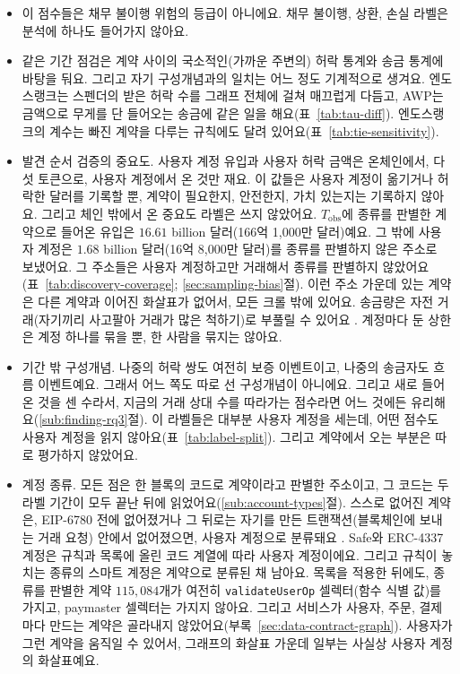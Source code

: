 \begin{itemize}
\item 이 점수들은 채무 불이행 위험의 등급이 아니에요. 채무 불이행, 상환, 손실 라벨은 분석에 하나도 들어가지 않아요.
\item 같은 기간 점검은 계약 사이의 국소적인(가까운 주변의) 허락 통계와 송금 통계에 바탕을 둬요. 그리고 자기 구성개념과의 일치는 어느 정도 기계적으로 생겨요. 엔도스랭크는 스펜더의 받은 허락 수를 그래프 전체에 걸쳐 매끄럽게 다듬고, AWP는 금액으로 무게를 단 들어오는 송금에 같은 일을 해요(표~\ref{tab:tau-diff}). 엔도스랭크의 계수는 빠진 계약을 다루는 규칙에도 달려 있어요(표~\ref{tab:tie-sensitivity}).
\item 발견 순서 검증의 중요도. 사용자 계정 유입과 사용자 허락 금액은 온체인에서, 다섯 토큰으로, 사용자 계정에서 온 것만 재요. 이 값들은 사용자 계정이 옮기거나 허락한 달러를 기록할 뿐, 계약이 필요한지, 안전한지, 가치 있는지는 기록하지 않아요. 그리고 체인 밖에서 온 중요도 라벨은 쓰지 않았어요. $T_{\mathrm{obs}}$에 종류를 판별한 계약으로 들어온 유입은 $16.61$ billion 달러(166억 1,000만 달러)예요. 그 밖에 사용자 계정은 $1.68$ billion 달러(16억 8,000만 달러)를 종류를 판별하지 않은 주소로 보냈어요. 그 주소들은 사용자 계정하고만 거래해서 종류를 판별하지 않았어요(표~\ref{tab:discovery-coverage}; \ref{sec:sampling-bias}절). 이런 주소 가운데 있는 계약은 다른 계약과 이어진 화살표가 없어서, 모든 크롤 밖에 있어요. 송금량은 자전 거래(자기끼리 사고팔아 거래가 많은 척하기)로 부풀릴 수 있어요 \parencite{victor2021washtrading}. 계정마다 둔 상한은 계정 하나를 묶을 뿐, 한 사람을 묶지는 않아요.
\item 기간 밖 구성개념. 나중의 허락 쌍도 여전히 보증 이벤트이고, 나중의 송금자도 흐름 이벤트예요. 그래서 어느 쪽도 따로 선 구성개념이 아니에요. 그리고 새로 들어온 것을 센 수라서, 지금의 거래 상대 수를 따라가는 점수라면 어느 것에든 유리해요(\ref{sub:finding-rq3}절). 이 라벨들은 대부분 사용자 계정을 세는데, 어떤 점수도 사용자 계정을 읽지 않아요(표~\ref{tab:label-split}). 그리고 계약에서 오는 부분은 따로 평가하지 않았어요.
\item 계정 종류. 모든 점은 한 블록의 코드로 계약이라고 판별한 주소이고, 그 코드는 두 라벨 기간이 모두 끝난 뒤에 읽었어요(\ref{sub:account-types}절). 스스로 없어진 계약은, EIP-6780 전에 없어졌거나 그 뒤로는 자기를 만든 트랜잭션(블록체인에 보내는 거래 요청) 안에서 없어졌으면, 사용자 계정으로 분류돼요 \parencite{ballet2023eip6780}. Safe와 ERC-4337 계정은 규칙과 목록에 올린 코드 계열에 따라 사용자 계정이에요. 그리고 규칙이 놓치는 종류의 스마트 계정은 계약으로 분류된 채 남아요. 목록을 적용한 뒤에도, 종류를 판별한 계약 $115{,}084$개가 여전히 \texttt{validateUserOp} 셀렉터(함수 식별 값)를 가지고, paymaster 셀렉터는 가지지 않아요. 그리고 서비스가 사용자, 주문, 결제마다 만드는 계약은 골라내지 않았어요(부록~\ref{sec:data-contract-graph}). 사용자가 그런 계약을 움직일 수 있어서, 그래프의 화살표 가운데 일부는 사실상 사용자 계정의 화살표예요.

\end{itemize}
